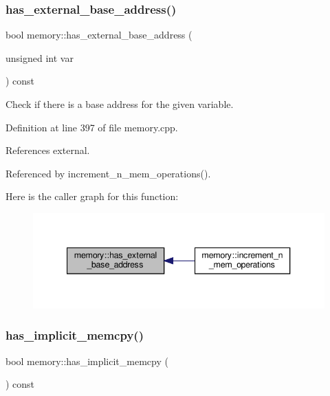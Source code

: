 \subsubsection{\texorpdfstring{has\+\_\+external\+\_\+base\+\_\+address()}{has\_external\_base\_address()}}
{\footnotesize\ttfamily bool memory\+::has\+\_\+external\+\_\+base\+\_\+address (\begin{DoxyParamCaption}\item[{unsigned int}]{var }\end{DoxyParamCaption}) const}



Check if there is a base address for the given variable. 



Definition at line 397 of file memory.\+cpp.



References external.



Referenced by increment\+\_\+n\+\_\+mem\+\_\+operations().

Here is the caller graph for this function\+:
\nopagebreak
\begin{figure}[H]
\begin{center}
\leavevmode
\includegraphics[width=340pt]{d8/d99/classmemory_a25b6c76946f47b674ad6d63efc48fd4d_icgraph}
\end{center}
\end{figure}
\mbox{\label{classmemory_ac71f7ac117e1a1d85c9de59084a7cc41}} 
\subsubsection{\texorpdfstring{has\+\_\+implicit\+\_\+memcpy()}{has\_implicit\_memcpy()}}
{\footnotesize\ttfamily bool memory\+::has\+\_\+implicit\+\_\+memcpy (\begin{DoxyParamCaption}{ }\end{DoxyParamCaption}) const\hspace{0.3cm}{\ttfamily [inline]}}



